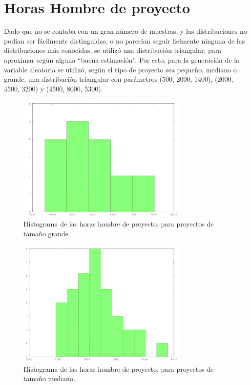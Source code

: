 \section*{Horas Hombre de proyecto}

Dado que no se contaba con un gran número de muestras, y las distribuciones no podían ser fácilmente distinguidas, o no parecían seguir fielmente ninguna de las distribuciones
más conocidas, se utilizó una distribución triangular, para aproximar según alguna ``buena estimación''. Por esto, para la generación de la variable aleatoria se utilizó, 
según el tipo de proyecto sea pequeño, mediano o grande, una distribución triangular con parámetros (500, 2000, 1400), (2000, 4500, 3200) y (4500, 8000, 5300).

\begin{figure}[H]
\begin{center}
 \includegraphics[width=0.75\textwidth,height=0.75\textheight,keepaspectratio]{./images/data-big-hours.png}
\end{center}
\caption{Histograma de las horas hombre de proyecto, para proyectos de tamaño grande.}
\end{figure}

\begin{figure}[H]
\begin{center}
 \includegraphics[width=0.75\textwidth,height=0.75\textheight,keepaspectratio]{./images/data-medium-hours.png}
\end{center}
\caption{Histograma de las horas hombre de proyecto, para proyectos de tamaño mediano.}
\end{figure}

